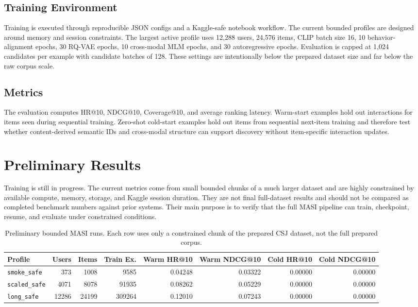 \documentclass[conference]{IEEEtran}
\begin{document}
\subsection{Training Environment}
Training is executed through reproducible JSON configs and a Kaggle-safe notebook workflow. The current bounded profiles are designed around memory and session constraints. The largest active profile uses 12,288 users, 24,576 items, CLIP batch size 16, 10 behavior-alignment epochs, 30 RQ-VAE epochs, 10 cross-modal MLM epochs, and 30 autoregressive epochs. Evaluation is capped at 1,024 candidates per example with candidate batches of 128. These settings are intentionally below the prepared dataset size and far below the raw corpus scale.

\subsection{Metrics}
The evaluation computes HR@10, NDCG@10, Coverage@10, and average ranking latency. Warm-start examples hold out interactions for items seen during sequential training. Zero-shot cold-start examples hold out items from sequential next-item training and therefore test whether content-derived semantic IDs and cross-modal structure can support discovery without item-specific interaction updates.

\section{Preliminary Results}
Training is still in progress. The current metrics come from small bounded chunks of a much larger dataset and are highly constrained by available compute, memory, storage, and Kaggle session duration. They are not final full-dataset results and should not be compared as completed benchmark numbers against prior systems. Their main purpose is to verify that the full MASI pipeline can train, checkpoint, resume, and evaluate under constrained conditions.

\begin{table}[t]
\centering
\caption{Preliminary bounded MASI runs. Each row uses only a constrained chunk of the prepared CSJ dataset, not the full prepared corpus.}
\label{tab:preliminary_results}
\renewcommand{\arraystretch}{1.15}
\begin{tabularx}{\textwidth}{@{}lrrrrrrr@{}}
\toprule
\textbf{Profile} & \textbf{Users} & \textbf{Items} & \textbf{Train Ex.} & \textbf{Warm HR@10} & \textbf{Warm NDCG@10} & \textbf{Cold HR@10} & \textbf{Cold NDCG@10} \\
\midrule
\texttt{smoke\_safe} & 373 & 1008 & 9585 & 0.04248 & 0.03322 & 0.00000 & 0.00000 \\
\texttt{scaled\_safe} & 4071 & 8078 & 91935 & 0.08262 & 0.05229 & 0.00000 & 0.00000 \\
\texttt{long\_safe} & 12286 & 24199 & 309264 & 0.12010 & 0.07243 & 0.00000 & 0.00000 \\
\bottomrule
\end{tabularx}
\end{table}
\end{document}
